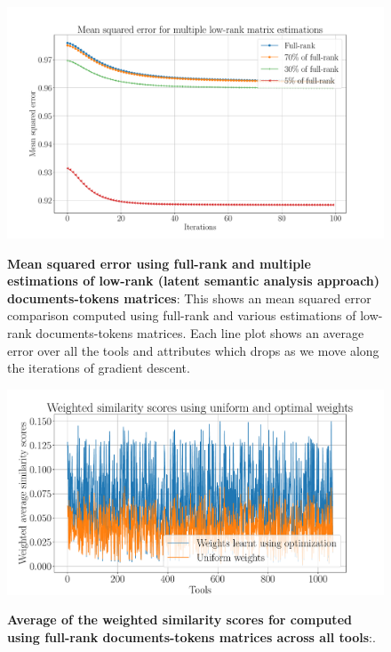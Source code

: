 \begin{figure}[h]
\begin{centering}
    {\includegraphics[scale=0.35]{figures/MSE_iterations_low_rank.pdf}}
    \caption[Mean squared error using full-rank and multiple estimations of low-rank (latent semantic analysis approach]{\textbf{Mean squared error using full-rank and multiple estimations of low-rank (latent semantic analysis approach) documents-tokens matrices}: This shows an mean squared error comparison computed using full-rank and various estimations of low-rank documents-tokens matrices. Each line plot shows an average error over all the tools and attributes which drops as we move along the iterations of gradient descent.}
\end{centering}
\end{figure}

\begin{figure}[h]
\begin{centering}
    {\includegraphics[scale=0.4]{figures/Optimization_100_lsi.pdf}}
    \caption[Average of the weighted similarity scores for computed using full-rank documents-tokens matrices across all tools]{\textbf{Average of the weighted similarity scores for computed using full-rank documents-tokens matrices across all tools}:.}
\end{centering}
\end{figure}


